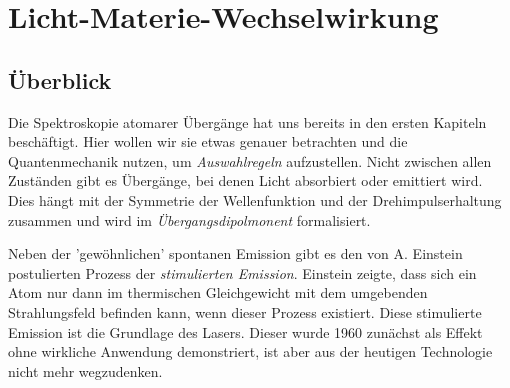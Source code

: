 \renewcommand{\lastmod}{24. November 2025}
\renewcommand{\chapterauthors}{Markus Lippitz}

\chapter{Licht-Materie-Wechselwirkung}






\section{Überblick}
Die Spektroskopie atomarer Übergänge hat uns bereits in den ersten Kapiteln beschäftigt. Hier wollen wir sie etwas genauer betrachten und die Quantenmechanik nutzen, um \emph{Auswahlregeln} aufzustellen. Nicht zwischen allen Zuständen gibt es Übergänge, bei denen Licht absorbiert oder emittiert wird. Dies hängt mit der Symmetrie der Wellenfunktion und der Drehimpulserhaltung zusammen und wird im \emph{Übergangsdipolmonent} formalisiert.



Neben der 'gewöhnlichen' spontanen Emission gibt es den von A. Einstein postulierten Prozess der \emph{stimulierten Emission}. Einstein zeigte, dass sich ein Atom nur dann im thermischen Gleichgewicht mit dem umgebenden Strahlungsfeld befinden kann, wenn dieser Prozess existiert. Diese stimulierte Emission ist die Grundlage des Lasers. Dieser wurde 1960 zunächst als Effekt ohne wirkliche Anwendung demonstriert, ist aber aus der heutigen Technologie nicht mehr wegzudenken.

